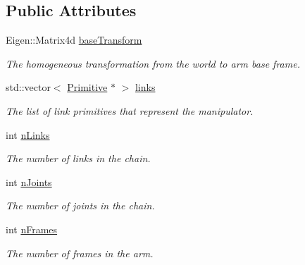 \subsection*{Public Attributes}
\begin{DoxyCompactItemize}
\item 
Eigen\+::\+Matrix4d \hyperlink{class_arm_ab568839905191e1e5abb83119a4a445d}{base\+Transform}\hypertarget{class_arm_ab568839905191e1e5abb83119a4a445d}{}\label{class_arm_ab568839905191e1e5abb83119a4a445d}

\begin{DoxyCompactList}\small\item\em The homogeneous transformation from the world to arm base frame. \end{DoxyCompactList}\item 
std\+::vector$<$ \hyperlink{class_primitive}{Primitive} $\ast$ $>$ \hyperlink{class_arm_a427fb95641bb8d0886b2849f0bda36be}{links}\hypertarget{class_arm_a427fb95641bb8d0886b2849f0bda36be}{}\label{class_arm_a427fb95641bb8d0886b2849f0bda36be}

\begin{DoxyCompactList}\small\item\em The list of link primitives that represent the manipulator. \end{DoxyCompactList}\item 
int \hyperlink{class_arm_a911ba9a8c719c090a305f88ab0ae7490}{n\+Links}\hypertarget{class_arm_a911ba9a8c719c090a305f88ab0ae7490}{}\label{class_arm_a911ba9a8c719c090a305f88ab0ae7490}

\begin{DoxyCompactList}\small\item\em The number of links in the chain. \end{DoxyCompactList}\item 
int \hyperlink{class_arm_ac3734a2ca38b0312fd42894ab6886bc9}{n\+Joints}\hypertarget{class_arm_ac3734a2ca38b0312fd42894ab6886bc9}{}\label{class_arm_ac3734a2ca38b0312fd42894ab6886bc9}

\begin{DoxyCompactList}\small\item\em The number of joints in the chain. \end{DoxyCompactList}\item 
int \hyperlink{class_arm_ac7955a5e8e9c6681b55d0d80d7e31df7}{n\+Frames}\hypertarget{class_arm_ac7955a5e8e9c6681b55d0d80d7e31df7}{}\label{class_arm_ac7955a5e8e9c6681b55d0d80d7e31df7}

\begin{DoxyCompactList}\small\item\em The number of frames in the arm. \end{DoxyCompactList}\end{DoxyCompactItemize}


